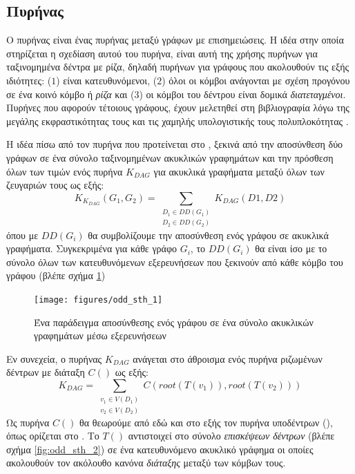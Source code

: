 \subsection{Πυρήνας }
\label{ssec:odd-sth}
Ο πυρήνας  είναι ένας πυρήνας μεταξύ γράφων με επισημειώσεις.
Η ιδέα στην οποία στηρίζεται η σχεδίαση αυτού του πυρήνα, είναι αυτή της χρήσης πυρήνων για ταξινομημένα δέντρα με ρίζα, δηλαδή πυρήνων για γράφους που ακολουθούν τις εξής ιδιότητες: ($1$) είναι κατευθυνόμενοι, ($2$) όλοι οι κόμβοι ανάγονται με σχέση προγόνου σε ένα κοινό κόμβο ή \textit{ρίζα} και ($3$) οι κόμβοι του δέντρου είναι δομικά \textit{διατεταγμένοι}.
Πυρήνες που αφορούν τέτοιους γράφους, έχουν μελετηθεί στη βιβλιογραφία λόγω της μεγάλης εκφραστικότητας τους και τις χαμηλής υπολογιστικής τους πολυπλοκότητας \cite{Haussler99ck, MA_ECML_2006, Vishwanathan2002}.\par
Η ιδέα πίσω από τον πυρήνα  που προτείνεται στο \cite{Martino2012ATK}, ξεκινά από την αποσύνθεση δύο γράφων σε ένα σύνολο ταξινομημένων ακυκλικών γραφημάτων και την πρόσθεση όλων των τιμών ενός πυρήνα $K_{DAG}$ για ακυκλικά γραφήματα μεταξύ όλων των ζευγαριών τους ως εξής:
\begin{equation}
K_{K_{DAG}}(G_{1}, G_{2}) = \sum_{\substack{D_{1} \in DD(G_{1}) \\
D_{2} \in DD(G_{2})}} K_{DAG}(D1, D2)
\end{equation}
όπου με $DD(G_{i})$ θα συμβολίζουμε την αποσύνθεση ενός γράφου σε ακυκλικά γραφήματα.
Συγκεκριμένα για κάθε γράφο $G_{i}$, το $DD(G_{i})$ θα είναι ίσο με το σύνολο όλων των κατευθυνόμενων εξερευνήσεων  που ξεκινούν από κάθε κόμβο του γράφου (βλέπε σχήμα \ref{fig:odd:bfs_explorations})
\begin{figure}[]
\centering
\texttt{[image: figures/odd\_sth\_1]}
\caption{Ένα παράδειγμα αποσύνθεσης ενός γράφου σε ένα σύνολο ακυκλικών γραφημάτων μέσω εξερευνήσεων }
\label{fig:odd:bfs_explorations}
\end{figure}
Εν συνεχεία, ο πυρήνας $K_{DAG}$ ανάγεται στο άθροισμα ενός πυρήνα ριζωμένων δέντρων με διάταξη $C()$ ως εξής:
\begin{equation}
K_{DAG} = \sum_{\substack{v_{1} \in V(D_{1}) \\ v_{2} \in V(D_{2})}} C(root(T(v_{1})), root(T(v_{2})))
\end{equation}
Ως πυρήνα $C()$ θα θεωρούμε από εδώ και στο εξής τον πυρήνα υποδέντρων (), όπως ορίζεται στο \cite{STKernel}.
Το $T()$ αντιστοιχεί στο σύνολο \textit{επισκέψεων δέντρων} (βλέπε σχήμα \ref{fig:odd_sth_2}) σε ένα κατευθυνόμενο ακυκλικό γράφημα οι οποίες ακολουθούν τον ακόλουθο κανόνα \textit{διάταξης} μεταξύ των κόμβων τους.
